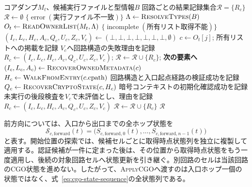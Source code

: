 \documentclass[10pt,a4paper]{ltjsarticle}
\begin{document}
\begin{algorithm}[H]
\caption{所有関係を起点とする回路状態復元}
\label{alg:core-recovery}
\small
\begin{algorithmic}[1]
\Require コアダンプ$M_t$、候補実行ファイルと型情報$B$
\Ensure 回路ごとの結果記録集合$\mathcal{R}=\{R_c\}$
\State $\mathcal{R}\gets\emptyset$
  \State \Return $\{\operatorname{error}(\text{実行ファイル不一致})\}$
\EndIf
\State $\Lambda\gets\Call{ResolveTypes}{B}$
\State $O_t\gets\Call{ReadOwnerList}{M_t,\Lambda}$
  \State \Return $\{\operatorname{incomplete}(\text{所有リスト取得不能})\}$
\EndIf
{}
  \State $(I_c,L_c,H_c,A_c,Q_c,U_c,Z_c,V_c)\gets(\bot,\bot,\bot,\bot,\bot,\bot,\bot,\emptyset)$
  \State $c\gets O_t[j]$; 所有リストへの掲載を記録
    \State $V_c$へ回路構造の失敗理由を記録
    \State $R_c\gets(I_c,L_c,H_c,A_c,Q_c,U_c,Z_c,V_c)$; $\mathcal{R}\gets\mathcal{R}\cup\{R_c\}$; \textbf{次の要素へ}
  \EndIf
    \State $(I_c,L_c,A_c)\gets\Call{RecoverOwnedMetadata}{c}$
    \State $H_c\gets\Call{WalkFromEntry}{c.\mathrm{cpath}}$
  \EndIf
    \State 回路構造と入口起点経路の検証成功を記録
    \State $Q_c\gets\Call{RecoverCryptoState}{c,H_c}$
      \State 暗号コンテキストの初期化確認成功を記録
    \EndIf
  \EndIf
  \State 未実行の後段検査を$V_c$で未評価とし、理由を記録
  \State $R_c\gets(I_c,L_c,H_c,A_c,Q_c,U_c,Z_c,V_c)$
  \State $\mathcal{R}\gets\mathcal{R}\cup\{R_c\}$
\EndFor
\State \Return $\mathcal{R}$
\end{algorithmic}
\end{algorithm}

前方向については、入口から出口までの全ホップ状態を
\begin{equation}
\mathcal{S}_{c,\mathrm{forward}}(t)=
\bigl(S_{c,\mathrm{forward},0}(t),\ldots,
S_{c,\mathrm{forward},n-1}(t)\bigr)
\label{eq:cgo-state-sequence}
\end{equation}
と表す。開始位置の探索では、候補セルごとに取得時点状態列を独立に複製して適用する。認証候補が一件に定まった後は、その位置から取得時点状態をもう一度適用し、後続の対象回路セルへ状態更新を引き継ぐ。別回路のセルは当該回路のCGO状態を進めない。したがって、\textsc{ApplyCGO}へ渡すのは入口ホップ一個の状態ではなく、式~\eqref{eq:cgo-state-sequence}の全状態列である。
\end{document}
